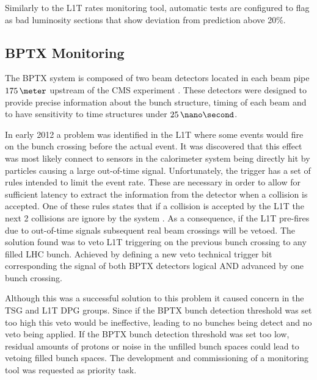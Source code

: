 Similarly to the \gls{L1T} rates monitoring tool, automatic tests are configured to flag as bad luminosity sections that show deviation from prediction above 20\%. 

\subsection{BPTX Monitoring}


The \gls{BPTX} system is composed of two beam detectors located in each beam pipe $175\,\meter$ upstream of the \gls{CMS} experiment \cite{ARTICLE:TheCMSExperiment}. These detectors were designed to provide precise information about the bunch structure, timing of each beam and to have sensitivity to time structures under $25\,\nano\second$. 

In early 2012 a problem was identified in the \gls{L1T} where some events would fire on the bunch crossing before the actual event. It was discovered that this effect was most likely connect to sensors in the calorimeter system being directly hit by particles causing a large out-of-time signal. Unfortunately, the trigger has a set of rules intended to limit the event rate. These are necessary in order to allow for sufficient latency to extract the information from the detector when a collision is accepted. One of these rules states that if a collision is accepted by the \gls{L1T} the next 2 collisions are ignore by the system \cite{CMSTDR:CMSTridasTDRVol1}. As a consequence, if the \gls{L1T} pre-fires due to out-of-time signals subsequent real beam crossings will be vetoed. The solution found was to veto \gls{L1T} triggering on the previous bunch crossing to any filled \gls{LHC} bunch. Achieved by defining a new veto technical trigger bit corresponding the signal of both \gls{BPTX} detectors logical AND advanced by one bunch crossing. 

Although this was a successful solution to this problem it caused concern in the \gls{TSG} and \gls{L1T} \gls{DPG} groups. Since if the \gls{BPTX} bunch detection threshold was set too high this veto would be ineffective, leading to no bunches being detect and no veto being applied. If the \gls{BPTX} bunch detection threshold was set too low, residual amounts of protons or noise in the unfilled bunch spaces could lead to vetoing filled bunch spaces. The development and commissioning of a monitoring tool was requested as priority task.

